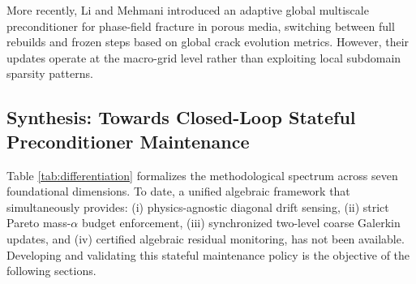 \documentclass[preprint,12pt,3p]{elsarticle}
\begin{document}
More recently, Li and Mehmani \cite{li2024multiscale} introduced an adaptive global multiscale preconditioner for phase-field fracture in porous media, switching between full rebuilds and frozen steps based on global crack evolution metrics. However, their updates operate at the macro-grid level rather than exploiting local subdomain sparsity patterns.

\subsection{Synthesis: Towards Closed-Loop Stateful Preconditioner Maintenance}
Table \ref{tab:differentiation} formalizes the methodological spectrum across seven foundational dimensions. To date, a unified algebraic framework that simultaneously provides:
(i) physics-agnostic diagonal drift sensing,
(ii) strict Pareto mass-$\alpha$ budget enforcement,
(iii) synchronized two-level coarse Galerkin updates, and
(iv) certified algebraic residual monitoring,
has not been available. Developing and validating this stateful maintenance policy is the objective of the following sections.
\end{document}
